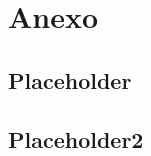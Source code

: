 \section{Anexo}

\subsection{Placeholder}
\label{anexo_sdsl4py}

\newpage

\subsection{Placeholder2}

